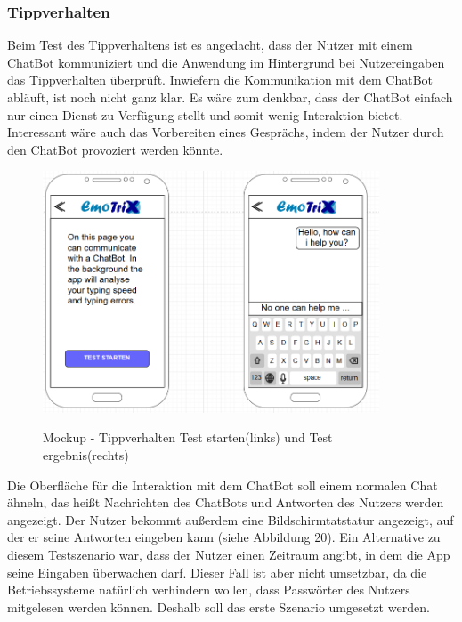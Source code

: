 \subsubsection{Tippverhalten}
Beim Test des Tippverhaltens ist es angedacht, dass der Nutzer mit einem ChatBot kommuniziert und die Anwendung im Hintergrund bei Nutzereingaben das Tippverhalten überprüft. Inwiefern die Kommunikation mit dem ChatBot abläuft, ist noch nicht ganz klar. Es wäre zum denkbar, dass der ChatBot einfach nur einen Dienst zu Verfügung stellt und somit wenig Interaktion bietet. Interessant wäre auch das Vorbereiten eines Gesprächs, indem der Nutzer durch den ChatBot provoziert werden könnte.
\begin{figure}[h]
	\centering
	\includegraphics[width=10cm]{Bilder/Mockup-Tippverhalten.png}
	\label{img:Mockup-Tippverhalten}
	\caption[Mockup - Tippverhalten Test starten(links) und Test ergebnis(rechts)]{Mockup - Tippverhalten Test starten(links) und Test ergebnis(rechts)}
\end{figure} \newline
Die Oberfläche für die Interaktion mit dem ChatBot soll einem normalen Chat ähneln, das heißt Nachrichten des ChatBots und Antworten des Nutzers werden angezeigt. Der Nutzer bekommt außerdem eine Bildschirmtatstatur angezeigt, auf der er seine Antworten eingeben kann (siehe Abbildung 20).\newline
Ein Alternative zu diesem Testszenario war, dass der Nutzer einen Zeitraum angibt, in dem die App seine Eingaben überwachen darf. Dieser Fall ist aber nicht umsetzbar, da die Betriebssysteme natürlich verhindern wollen, dass Passwörter des Nutzers mitgelesen werden können.
Deshalb soll das erste Szenario umgesetzt werden.
